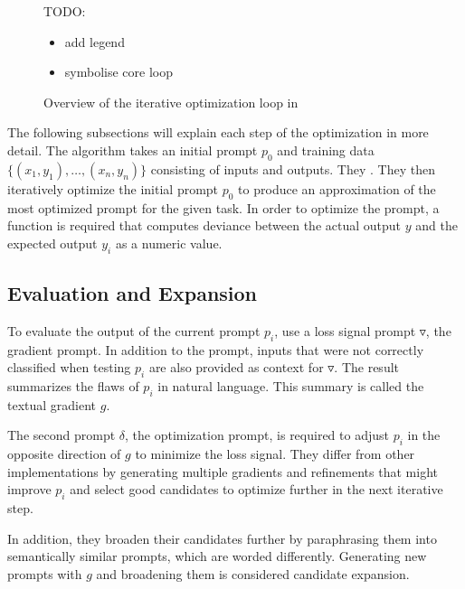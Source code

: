 \begin{figure}
\centering

\caption{Overview of the iterative optimization loop in \cite{pryzant2023AutomaticPrompt}}
\label{fig:gradient_descent}
TODO: 
\begin{itemize}
    \item add legend
    \item symbolise core loop
\end{itemize}
\end{figure}

The following subsections will explain each step of the \ProTeGi optimization in more detail. The \ProTeGi algorithm takes an initial prompt $p_0$ and training data $\{(x_1, y_1), \dots, (x_n, y_n)\}$ consisting of inputs and outputs. They . They then iteratively optimize the initial prompt $p_0$ to produce an approximation of the most optimized prompt for the given task. In order to optimize the prompt, a function is required that computes deviance between the actual output $y$ and the expected output $y_i$ as a numeric value.


\subsection{Evaluation and Expansion}
To evaluate the output of the current prompt $p_i$, \citeauthor{pryzant2023AutomaticPrompt} use a loss signal prompt $\triangledown$, the gradient prompt. In addition to the prompt, inputs that were not correctly classified when testing $p_i$ are also provided as context for $\triangledown$. The result summarizes the flaws of $p_i$ in natural language. This summary is called the textual gradient $g$.

The second prompt $\delta$, the optimization prompt, is required to adjust $p_i$ in the opposite direction of $g$ to minimize the loss signal. They differ from other implementations by generating multiple gradients and refinements that might improve $p_i$ and select good candidates to optimize further in the next iterative step.

In addition, they broaden their candidates further by paraphrasing them into semantically similar prompts, which are worded differently. Generating new prompts with $g$ and broadening them is considered candidate expansion.


